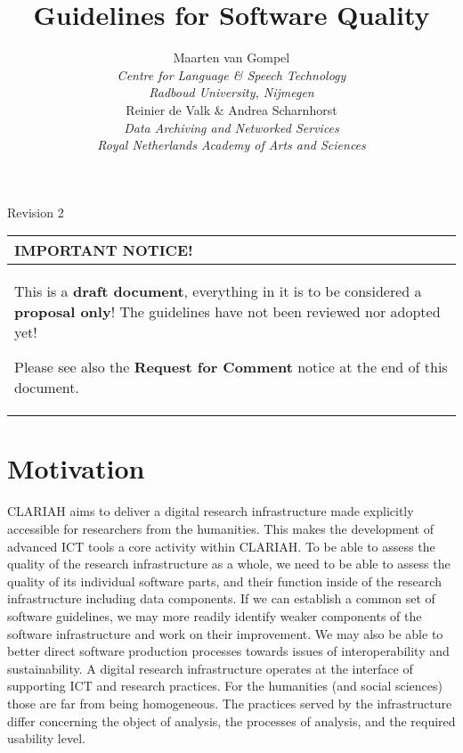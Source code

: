 \documentclass[a4paper,11pt]{article}
\newcommand{\subtitle}[1]{%
  \posttitle{%
    \par\end{center}
    \begin{center}\large#1\end{center}
    \vskip0.5em}%
}
\newenvironment{notice}{
\begin{center}
    \begin{tabular}[h!]{|p{0.8\textwidth}|}
    \hline
    {\bf IMPORTANT NOTICE!}\\\hline}
{   \\\hline
    \end{tabular}
\end{center}}
\begin{document}
\title{Guidelines for Software Quality}
\subtitle{CLARIAH Task 54.100} 
\author{Maarten van Gompel \\ \emph{Centre for Language \& Speech Technology} \\
\emph{Radboud University, Nijmegen} \\  Reinier de Valk \& Andrea Scharnhorst
\\ \emph{Data Archiving and Networked Services} \\ \emph{Royal Netherlands Academy of Arts and Sciences}}


\maketitle

\begin{center}
Revision 2
\end{center}

\begin{notice} 
This is a \textbf{draft document}, everything in it is to be considered a
\textbf{proposal only}! The guidelines have not been reviewed nor adopted yet!

Please see also the \textbf{Request for Comment} notice at the end of this document.
\end{notice}

\tableofcontents

\section{Motivation}

CLARIAH aims to deliver a digital research infrastructure made explicitly
accessible for researchers from the humanities. This makes the development of
advanced ICT tools a core activity within CLARIAH. To be able to assess the
quality of the research infrastructure as a whole, we need to be able to assess
the quality of its individual software parts, and their function inside of the
research infrastructure including data components. If we can establish a common
set of software guidelines, we may more readily identify weaker components of
the software infrastructure and work on their improvement. We may also be able
to better direct software production processes towards issues of
interoperability and sustainability.  A digital research infrastructure
operates at the interface of supporting ICT and research practices. For the
humanities (and social sciences) those are far from being homogeneous. The
practices served by the infrastructure differ concerning the object of
analysis, the processes of analysis, and the required usability level. 
\end{document}
